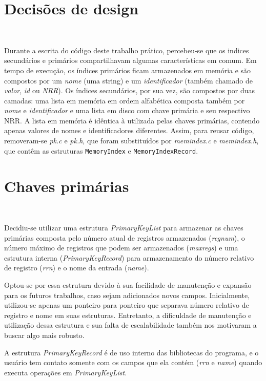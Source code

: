 \documentclass{article}
\begin{document}
\section{Decisões de design}\

Durante a escrita do código deste trabalho prático, percebeu-se que os indices secundários e primários compartilhavam algumas características em comum. Em tempo de execução, os índices primários ficam armazenados em memória e são compostos por um \textit{nome} (uma string) e um \textit{identificador} (também chamado de \textit{valor}, \textit{id} ou \textit{NRR}). Os índices secundários, por sua vez, são compostos por duas camadas: uma lista em memória em ordem alfabética composta também por \textit{nome} e \textit{identificador} e uma lista em disco com chave primária e seu respectivo NRR. A lista em memória é idêntica à utilizada pelas chaves primárias, contendo apenas valores de nomes e identificadores diferentes. Assim, para reusar código, removeram-se \textit{pk.c} e \textit{pk.h}, que foram substituídos por \textit{memindex.c} e \textit{memindex.h}, que contêm as estruturas \texttt{MemoryIndex} e \texttt{MemoryIndexRecord}.

\section{Chaves primárias}\

Decidiu-se utilizar uma estrutura \textit{PrimaryKeyList} para armazenar as chaves primárias composta pelo número atual de registros armazenados (\textit{regnum}), o número máximo de registros que podem ser armazenados (\textit{maxregs}) e uma estrutura interna (\textit{PrimaryKeyRecord}) para armazenamento do número relativo de registro (\textit{rrn}) e o nome da entrada (\textit{name}).

Optou-se por essa estrutura devido à sua facilidade de manutenção e expansão para os futuros trabalhos, caso sejam adicionados novos campos. Inicialmente, utilizou-se apenas um ponteiro para ponteiro que separava número relativo de registro e nome em suas estruturas. Entretanto, a dificuldade de manutenção e utilização dessa estrutura e sua falta de escalabilidade também nos motivaram a buscar algo mais robusto.

A estrutura \textit{PrimaryKeyRecord} é de uso interno das bibliotecas do programa, e o usuário tem contato somente com os campos que ela contém (\textit{rrn} e \textit{name}) quando executa operações em \textit{PrimaryKeyList}.
\end{document}
